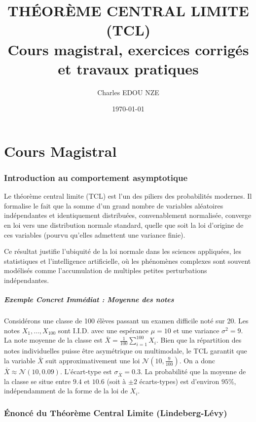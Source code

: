 \documentclass[11pt,a4paper]{article}
\title{\Huge THÉORÈME CENTRAL LIMITE (TCL) \\ \large Cours magistral, exercices corrigés et travaux pratiques}
\author{\Large Charles EDOU NZE}
\date{\today}
\begin{document}
\maketitle
\tableofcontents
\newpage
\part{Cours Magistral}




\section{Introduction au comportement asymptotique}

Le théorème central limite (TCL) est l'un des piliers des probabilités modernes. Il formalise le fait que la somme d'un grand nombre de variables aléatoires indépendantes et identiquement distribuées, convenablement normalisée, converge en loi vers une distribution normale standard, quelle que soit la loi d'origine de ces variables (pourvu qu'elles admettent une variance finie).

Ce résultat justifie l'ubiquité de la loi normale dans les sciences appliquées, les statistiques et l'intelligence artificielle, où les phénomènes complexes sont souvent modélisés comme l'accumulation de multiples petites perturbations indépendantes.

\subsubsection{Exemple Concret Immédiat : Moyenne des notes}

Considérons une classe de 100 élèves passant un examen difficile noté sur 20. Les notes $X_1, \dots, X_{100}$ sont I.I.D. avec une espérance $\mu = 10$ et une variance $\sigma^2 = 9$.
La note moyenne de la classe est $\bar{X} = \frac{1}{100} \sum_{i=1}^{100} X_i$.
Bien que la répartition des notes individuelles puisse être asymétrique ou multimodale, le TCL garantit que la variable $\bar{X}$ suit approximativement une loi $\mathcal{N}(10, \frac{9}{100})$.
On a donc $\bar{X} \approx \mathcal{N}(10, 0.09)$. L'écart-type est $\sigma_{\bar{X}} = 0.3$.
La probabilité que la moyenne de la classe se situe entre $9.4$ et $10.6$ (soit à $\pm 2$ écarts-types) est d'environ $95\%$, indépendamment de la forme de la loi de $X_i$.

\section{Énoncé du Théorème Central Limite (Lindeberg-Lévy)}
\end{document}

